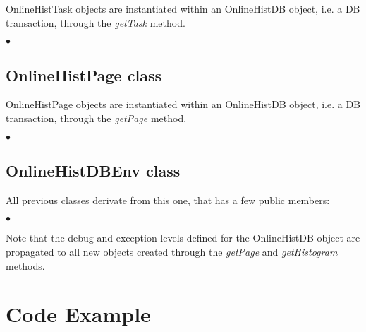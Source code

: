 \documentclass{lhcbnote}
\begin{document}
OnlineHistTask objects are instantiated within an
OnlineHistDB object, i.e. a DB transaction, through the {\it getTask} method.

\begin{list}{$\bullet$}{}

\end{list}


\subsection{OnlineHistPage class}

OnlineHistPage objects are instantiated within an
OnlineHistDB object, i.e. a DB transaction, through the {\it
getPage} method.

\begin{list}{$\bullet$}{}

\end{list}


\subsection{OnlineHistDBEnv class}\label{dbenvclass}
All previous classes derivate from this one, that has a few public
members:
\begin{list}{$\bullet$}{}

\end{list}

Note that the debug and exception levels defined for the OnlineHistDB object are
propagated to all new objects created through the {\it getPage} and
{\it getHistogram} methods.



\section{Code Example}
\end{document}
